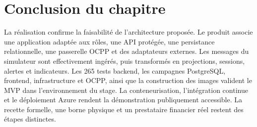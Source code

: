\clearpage
\section{Conclusion du chapitre}

La réalisation confirme la faisabilité de l'architecture proposée. Le produit
associe une application adaptée aux rôles, une API protégée, une persistance
relationnelle, une passerelle OCPP et des adaptateurs externes. Les messages du
simulateur sont effectivement ingérés, puis transformés en projections, sessions,
alertes et indicateurs. Les 265 tests backend, les campagnes PostgreSQL,
frontend, infrastructure et OCPP, ainsi que la construction des images valident
le MVP dans l'environnement du stage. La conteneurisation, l'intégration continue
et le déploiement Azure rendent la démonstration publiquement accessible. La
recette formelle, une borne physique et un prestataire financier réel restent des
étapes distinctes.
